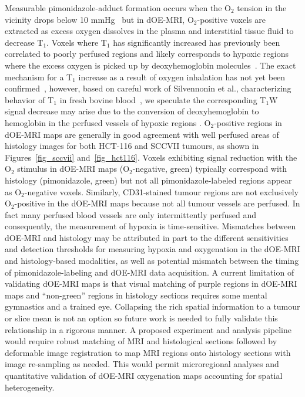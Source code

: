 Measurable pimonidazole-adduct formation occurs when the O$_2$ tension in the vicinity drops below 10 mmHg~\cite{Gross:1995wq} but in \acs{dOE-MRI}, O$_2$-positive voxels are extracted as excess oxygen dissolves in the plasma and interstitial tissue fluid to decrease T$_1$.
Voxels where T$_1$ has significantly increased has previously been correlated to poorly perfused regions and likely corresponds to hypoxic regions where the excess oxygen is picked up by deoxyhemoglobin molecules~\cite{Linnik:2013hf,Burrell:2013je,Remmele:2012df}.
The exact mechanism for a T$_1$ increase as a result of oxygen inhalation has not yet been confirmed~\cite{Zhao:2015ez,Linnik:2013hf}, however, based on careful work of Silvennonin et al., characterizing behavior of T$_1$ in fresh bovine blood~\cite{Silvennoinen:2003gn}, we speculate the corresponding T$_1$W signal decrease may arise due to the conversion of deoxyhemoglobin to hemoglobin in the perfused vessels of hypoxic regions .
O$_2$-positive regions in \acs{dOE-MRI} maps are generally in good agreement with well perfused areas of histology images for both HCT-116 and SCCVII tumours, as shown in Figures~\ref{fig_sccvii} and~\ref{fig_hct116}.
Voxels exhibiting signal reduction with the O$_2$ stimulus in \acs{dOE-MRI} maps (O$_2$-negative, green) typically correspond with histology (pimonidazole, green) but not all pimonidazole-labeled regions appear as O$_2$-negative voxels.
Similarly, \acs{CD31}-stained tumour regions are not exclusively O$_2$-positive in the \acs{dOE-MRI} maps because not all tumour vessels are perfused.
In fact many perfused blood vessels are only intermittently perfused and consequently, the measurement of hypoxia is time-sensitive.
Mismatches between \acs{dOE-MRI} and histology may be attributed in part to the different sensitivities and detection thresholds for measuring hypoxia and oxygenation in the \acs{dOE-MRI} and histology-based modalities, as well as potential mismatch between the timing of pimonidazole-labeling and \acs{dOE-MRI} data acquisition.
A current limitation of validating \acs{dOE-MRI} maps is that visual matching of purple regions in \acs{dOE-MRI} maps and ``non-green'' regions in histology sections requires some mental gymnastics and a trained eye.
Collapsing the rich spatial information to a tumour or slice mean is not an option so future work is needed to fully validate this relationship in a rigorous manner.
A proposed experiment and analysis pipeline would require robust matching of MRI and histological sections followed by deformable image registration to map MRI regions onto histology sections with image re-sampling as needed.
This would permit microregional analyses and quantitative validation of \acs{dOE-MRI} oxygenation maps accounting for spatial heterogeneity.

